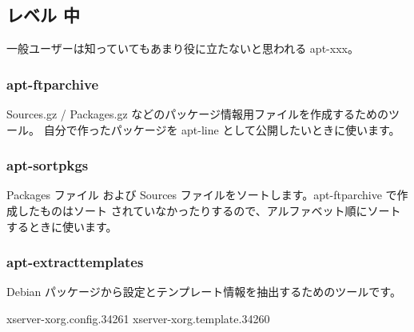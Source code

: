 \documentclass[mingoth,a4paper]{jsarticle}
\begin{document}
\subsection{レベル 中}
 一般ユーザーは知っていてもあまり役に立たないと思われる apt-xxx。
\subsubsection{apt-ftparchive}
 Sources.gz / Packages.gz などのパッケージ情報用ファイルを作成するためのツール。
 自分で作ったパッケージを apt-line として公開したいときに使います。
\begin{commandline}
\end{commandline}

\subsubsection{apt-sortpkgs}
 Packages ファイル および Sources ファイルをソートします。apt-ftparchive で作成したものはソート
 されていなかったりするので、アルファベット順にソートするときに使います。
\begin{commandline}
\end{commandline} 

\subsubsection{apt-extracttemplates}
 Debian パッケージから設定とテンプレート情報を抽出するためのツールです。

\begin{commandline}
 xserver-xorg.config.34261
 xserver-xorg.template.34260
\end{commandline}
\end{document}

